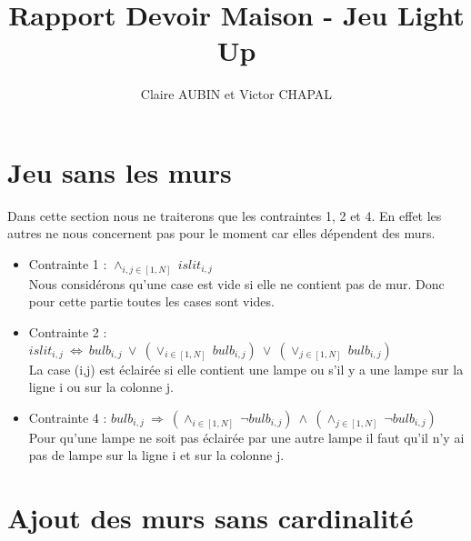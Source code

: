 \documentclass{article}
\begin{document}
\title{Rapport Devoir Maison - Jeu Light Up}
\author{Claire AUBIN et Victor CHAPAL}
\maketitle

\section{Jeu sans les murs}
Dans cette section nous ne traiterons que les contraintes 1, 2 et 4. En effet les autres ne nous concernent pas pour le moment car elles dépendent des murs.

\begin{itemize}
\item Contrainte 1 : $ \wedge_{i,j \in [1,N]} ~ islit_{i,j}  $ \\
 Nous considérons qu'une case est vide si elle ne contient pas de mur. Donc pour cette partie toutes les cases sont vides.
  
\item Contrainte 2 : $ islit_{i,j} ~ \Leftrightarrow ~ bulb_{i,j} ~ \vee ~ (\vee_{i \in [1,N]} ~ bulb_{i,j}) ~ \vee ~ (\vee_{j \in [1,N]} ~ bulb_{i,j}) $\\
  La case (i,j) est éclairée si elle contient une lampe ou s'il y a une lampe sur la ligne i ou sur la colonne j.
  
\item Contrainte 4 : $ bulb_{i,j} ~ \Rightarrow ~ (\wedge_{i \in [1,N]} ~ \neg bulb_{i,j}) ~ \wedge ~ (\wedge_{j \in [1,N]} ~ \neg bulb_{i,j})  $ \\
  Pour qu'une lampe ne soit pas éclairée par une autre lampe il faut qu'il n'y ai pas de lampe sur la ligne i et sur la colonne j.
\end{itemize}




\section{Ajout des murs sans cardinalit\'e}
\end{document}
